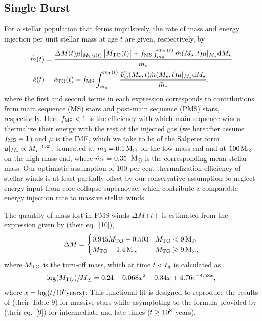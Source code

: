 \subsection{Single Burst}

For a stellar population that forms impulsively, the rate of mass and energy injection per unit stellar mass at age $t$ are given, respectively, by 
\begin{align} 
  \dot{\bar{m}}(t) &= \frac{\Delta M(t) \mu|_{M_{\rm TO}(t)}
    \left|\dot{M}_{\rm TO}(t)\right| + f_{\rm MS} \int_{m_0}^{m_{\rm
        T}(t)}
    \dot{m}(M_{\star}, t) \mu|_{M_{\star}} {\rm d}M_{\star} }{\bar{m}_*}\\
  \dot{\bar{e}}(t) &=\dot{e}_{\rm TO}(t)+ f_{\rm MS} \int_{m_0}^{m_{\rm T}(t)}
  \frac{\tilde{v}_{w}^2(M_{\star}, t) \dot{m}(M_{\star}, t) \mu|_{M_{\star}} {\rm d}M_{\star}}{\bar{m}_*},
  \label{eq:edotImp}
\end{align} 
where the first and second terms in each expression corresponds to
contributions from main sequence (MS) stars and post-main sequence
(PMS) stars, respectively.  Here $ f_{\rm MS} < 1$ is the efficiency
with which main sequence winds thermalize their energy with the rest
of the injected gas (we hereafter assume $f_{\rm MS} = 1$) and $\mu$
is the IMF, which we take to be of the Salpeter form $\mu|_{M_{\star}} \propto
M_{\star}^{-2.35}$, truncated at $m_0 = 0.1 \,{\rm M_\odot}$ on the low mass end and at
$100 \,{\rm M_\odot}$ on the high mass end, where $\bar{m}_*$ = 0.35 $\,{\rm M_\odot}$ is
the corresponding mean stellar mass.  Our optimistic assumption of 100 per cent thermalization efficiency of stellar winds is at least partially offset by our conservative assumption to neglect energy input from core collapse supernovae, which contribute a comparable energy injection rate to massive stellar winds.  

The quantity of mass lost in PMS winds $\Delta M(t)$ is estimated from the expression given by \citet{CiottiOstriker:2007a} (their eq.~[10]),
\begin{align}
\Delta M=
\begin{cases}
0.945 M_{\rm TO}-0.503 & M_{\rm TO} < 9 \,{\rm M_\odot}\\
 M_{\rm TO}-1.4 \,{\rm M_\odot} &  M_{\rm TO} \geqslant 9 \,{\rm M_\odot},
\end{cases}
\end{align}
where $M_{\rm TO}$ is the turn-off mass, which at time $t < t_{\rm h}$ is calculated as
\begin{align}
\log(M_{\rm TO})/M_{\odot} =0.24 + 0.068 x^2-0.34 x+4.76 e^{-4.58 x},
\end{align}
where $x=\log(t/10^9 {\rm years})$.  This functional fit is designed
to reproduce the results of \citet{MaederMeynet:1987a} (their Table 9)
for massive stars while asymptoting to the formula provided by
\citet{CiottiOstriker:2007a} (their eq.~[9]) for intermediate and late
times ($t \gsim 10^8$ years).


